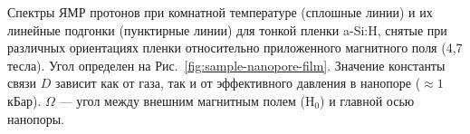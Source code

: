 Спектры ЯМР протонов при комнатной температуре (сплошные линии)
и их линейные подгонки (пунктирные линии)
для тонкой пленки a-Si:H,
снятые при различных ориентациях пленки относительно приложенного магнитного поля (4,7 тесла).
Угол определен на  Рис.~\ref{fig:sample-nanopore-film}.
Значение константы связи $D$ зависит как от газа,
так и от эффективного давления в нанопоре ($\approx 1$ кБар).
$\Omega$ --- угол между внешним магнитным полем (H$_0$) и главной осью нанопоры.